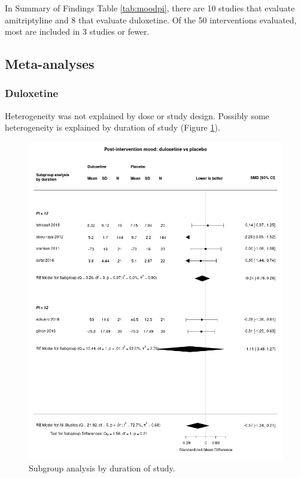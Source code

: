 \documentclass{report}\usepackage[]{graphicx}\usepackage[]{color}
\begin{document}
In Summary of Findings Table \ref{tab:moodpi}, there are 10 studies that evaluate amitriptyline and 8 that evaluate duloxetine. Of the 50 interventions evaluated, most are included in 3 studies or fewer.

\subsection{Meta-analyses}

\subsubsection{Duloxetine}

Heterogeneity was not explained by dose or study design. Possibly some heterogeneity is explained by duration of study (Figure \ref{fig:moodpi-duration-dulox-plac}).

\begin{figure}
\includegraphics[width=\textwidth]{img/mood-post_int-duration-duloxetine-placebo-forest.png}
\caption[Mood by duration, duloxetine]{Subgroup analysis by duration of study.}
\label{fig:moodpi-duration-dulox-plac}
\end{figure}
\end{document}
